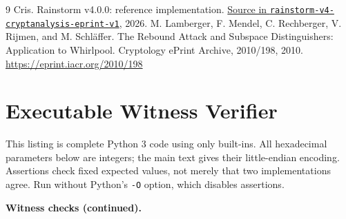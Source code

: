 \documentclass[10pt]{article}
\theoremstyle{definition}
\newcommand{\code}[1]{\texttt{#1}}
\newcommand{\archiveTag}{rainstorm-v4-cryptanalysis-eprint-v1}
\newcommand{\archiveName}{\nolinkurl{rainstorm-v4-cryptanalysis-eprint-v1}}
\newcommand{\archiveRoot}{https://github.com/DOSAYGO-STUDIO/rain}
\newcommand{\archiveFile}[2]{\href{\archiveRoot/blob/\archiveTag/#1}{#2}}
\begin{document}
\begin{thebibliography}{9}
Cris. Rainstorm v4.0.0: reference implementation.
\archiveFile{src/rainstorm.cpp}{Source in \archiveName}, 2026.
M. Lamberger, F. Mendel, C. Rechberger, V. Rijmen, and M. Schl\"affer.
The Rebound Attack and Subspace Distinguishers: Application to Whirlpool.
Cryptology ePrint Archive, 2010/198, 2010.
\url{https://eprint.iacr.org/2010/198}
\end{thebibliography}

\clearpage
\appendix
\section{Executable Witness Verifier}\label{sec:verifier}
This listing is complete Python 3 code using only built-ins. All hexadecimal parameters below are integers; the main text gives their little-endian encoding. Assertions check fixed expected values, not merely that two implementations agree. Run without Python's \code{-O} option, which disables assertions.

\clearpage
\noindent\textbf{Witness checks (continued).}

\end{document}
